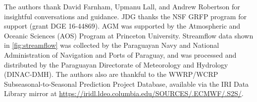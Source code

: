 \documentclass[twocol]{ametsoc}
\begin{document}

\acknowledgments
The authors thank David Farnham, Upmanu Lall, and Andrew Robertson for insightful conversations and guidance.
JDG thanks the NSF GRFP program for support (grant DGE 16-44869).
AGM was supported by the Atmospheric and Oceanic Sciences (AOS) Program at Princeton University.
Streamflow data shown in \cref{fig:streamflow} was collected by the Paraguayan Navy and National Administration of Navigation and Ports of Paraguay, and was processed and distributed by the Paraguayan Directorate of Meteorology and Hydrology (DINAC-DMH).
The authors also are thankful to the WWRP/WCRP Subseasonal-to-Seasonal Prediction Project Database, available via the IRI Data Library mirror at \url{https://iridl.ldeo.columbia.edu/SOURCES/.ECMWF/.S2S/}.




\end{document}
